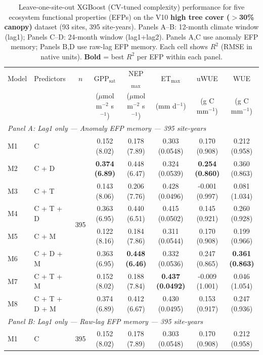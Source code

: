 \begin{table}[htbp]
\centering
\caption{Leave-one-site-out XGBoost (CV-tuned complexity) performance for five ecosystem functional properties (EFPs) on the V10 \textbf{high tree cover ($>$30\% canopy)} dataset (93 sites, 395 site-years). Panels A--B: 12-month climate window (lag1); Panels C--D: 24-month window (lag1+lag2). Panels A,C use anomaly EFP memory; Panels B,D use raw-lag EFP memory. Each cell shows $R^2$ (RMSE in native units). \textbf{Bold} = best $R^2$ per EFP within each panel.}
\label{tab:XGBtuned_LOSO_v10_filtered}
\footnotesize
\setlength{\tabcolsep}{4pt}
\begin{tabular}{llcccccc}
\toprule
Model & Predictors & $n$ & GPP$_\mathrm{sat}$ & NEP$_\mathrm{max}$ & ET$_\mathrm{max}$ & uWUE & WUE \\
  &  &  & ($\mu$mol m$^{-2}$ s$^{-1}$) & ($\mu$mol m$^{-2}$ s$^{-1}$) & (mm d$^{-1}$) & (g C mm$^{-1}$) & (g C mm$^{-1}$) \\
\midrule
\multicolumn{8}{l}{\textit{Panel A: Lag1 only --- Anomaly EFP memory --- 395 site-years}} \\
\midrule
M1 & C & \multirow{8}{*}{395} & 0.152 (8.02) & 0.178 (7.89) & 0.303 (0.0548) & 0.170 (0.908) & 0.212 (0.958) \\
M2 & C + D &  & \textbf{0.374 (6.89)} & 0.448 (6.47) & 0.324 (0.0539) & \textbf{0.254 (0.860)} & 0.360 (0.863) \\
M3 & C + T &  & 0.143 (8.06) & 0.206 (7.76) & 0.428 (0.0496) & -0.001 (0.997) & 0.081 (1.034) \\
M4 & C + T + D &  & 0.363 (6.95) & 0.440 (6.51) & 0.415 (0.0502) & 0.145 (0.921) & 0.260 (0.928) \\
M5 & C + M &  & 0.122 (8.16) & 0.184 (7.86) & 0.311 (0.0544) & 0.170 (0.908) & 0.199 (0.966) \\
M6 & C + D + M &  & 0.363 (6.95) & \textbf{0.448 (6.46)} & 0.332 (0.0536) & 0.247 (0.865) & \textbf{0.361 (0.863)} \\
M7 & C + T + M &  & 0.152 (8.02) & 0.188 (7.84) & \textbf{0.437 (0.0492)} & -0.009 (1.001) & 0.046 (1.054) \\
M8 & C + T + D + M &  & 0.374 (6.89) & 0.412 (6.67) & 0.430 (0.0495) & 0.153 (0.917) & 0.247 (0.936) \\
\midrule
\multicolumn{8}{l}{\textit{Panel B: Lag1 only --- Raw-lag EFP memory --- 395 site-years}} \\
\midrule
M1 & C & \multirow{8}{*}{395} & 0.152 (8.02) & 0.178 (7.89) & 0.303 (0.0548) & 0.170 (0.908) & 0.212 (0.958) \\

\end{tabular}
\end{table}
